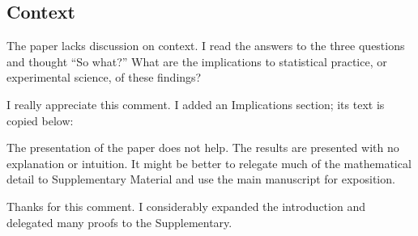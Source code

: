\begin{quote}
  
\end{quote}


\subsection{Context}
\RC The paper lacks discussion on context. I read the answers to the
three questions and thought “So what?”  What are the implications to
statistical practice, or experimental science, of these findings?

\AR I really appreciate this comment. I added an Implications
  section; its text is copied below:



  \begin{quote}
    
  \end{quote}
  



\RC The presentation of the paper does not help. The results are
presented with no explanation or intuition. It might be better to
relegate much of the mathematical detail to Supplementary Material and
use the main manuscript for exposition.

\AR Thanks for this comment. I considerably expanded the
  introduction and delegated many proofs to the Supplementary.


